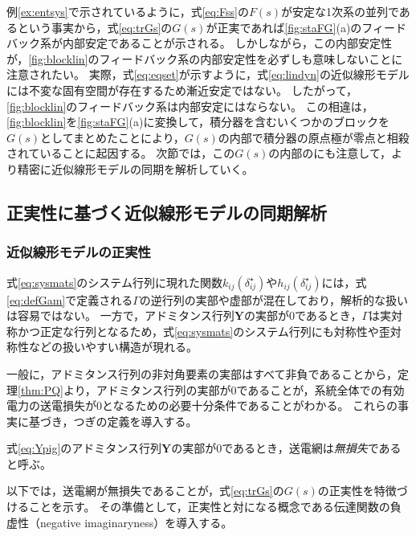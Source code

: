 \documentclass[tombow,dvipdfmx]{corona-a5}
\begin{document}
例\ref{ex:entsys}で示されているように，式\ref{eq:Fss}の$F(s)$が安定な1次系の並列であるという事実から，式\ref{eq:trGs}の$G(s)$が正実であれば\ref{fig:staFG}(a)のフィードバック系が内部安定であることが示される。
しかしながら，この内部安定性が，\ref{fig:blocklin}のフィードバック系の内部安定性を必ずしも意味しないことに注意されたい。
実際，式\ref{eq:eqset}が示すように，式\ref{eq:lindyn}の近似線形モデルには不変な固有空間が存在するため漸近安定ではない。
したがって，\ref{fig:blocklin}のフィードバック系は内部安定にはならない。
この相違は，\ref{fig:blocklin}を\ref{fig:staFG}(a)に変換して，積分器を含むいくつかのブロックを$G(s)$としてまとめたことにより，$G(s)$の内部で積分器の原点極が零点と相殺されていることに起因する。
次節では，この$G(s)$の内部のにも注意して，より精密に近似線形モデルの同期を解析していく。

\subsection{正実性に基づく近似線形モデルの同期解析\advanced}\label{sec:syncanp}


\subsubsection{近似線形モデルの正実性}

式\ref{eq:sysmats}のシステム行列に現れた関数$k_{ij}(\delta_{ij}^{\star})$や$h_{ij}(\delta_{ij}^{\star})$には，式\ref{eq:defGam}で定義される$\bm{\mathit{\Gamma}}$の逆行列の実部や虚部が混在しており，解析的な扱いは容易ではない。
一方で，アドミタンス行列$\bm{Y}$の実部が0であるとき，$\bm{\mathit{\Gamma}}$は実対称かつ正定な行列となるため，式\ref{eq:sysmats}のシステム行列にも対称性や歪対称性などの扱いやすい構造が現れる。

一般に，アドミタンス行列の非対角要素の実部はすべて非負であることから，定理\ref{thm:PQ}より，アドミタンス行列の実部が0であることが，系統全体での有効電力の送電損失が0となるための必要十分条件であることがわかる。
これらの事実に基づき，つぎの定義を導入する。

\begin{定義}[無損失な送電網]\label{def:lless}
式\ref{eq:Ypig}のアドミタンス行列$\bm{Y}$の実部が0であるとき，送電網は\emph{無損失}であると呼ぶ。
\end{定義}

以下では，送電網が無損失であることが，式\ref{eq:trGs}の$G(s)$の正実性を特徴づけることを示す。
その準備として，正実性と対になる概念である伝達関数の負虚性（negative imaginaryness）を導入する\cite{petersen2010feedback,xiong2010negative}。
\end{document}
